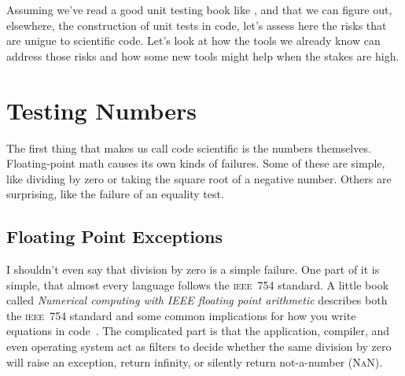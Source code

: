 \documentclass[fleqn,10pt]{olplainarticle}
\newcommand{\nan}{\textsc{NaN}\xspace}
\newcommand{\ieee}{\textsc{ieee}\xspace}
\begin{document}
Assuming we've read a good unit testing book like \cite{jorgensen2013},
and that we can figure out, elsewhere, the construction of unit tests
in code, let's assess here the risks that are unigue to scientific code.
Let's look at how the tools we already know can address those risks
and how some new tools might help when the stakes are high.




\section{Testing Numbers}\label{sec:ieee-numbers}

The first thing that makes us call code scientific is the numbers themselves.
Floating-point math causes its own kinds of failures. Some of these are simple,
like dividing by zero or taking the square root of a negative number.
Others are surprising, like the failure of an equality test.

\subsection{Floating Point Exceptions}
I shouldn't even say that division by zero is a simple failure.
One part of it is simple, that almost every language follows the
\ieee~754 standard.
A little book called \emph{Numerical computing with IEEE floating point arithmetic}
describes both the \ieee~754 standard
and some common implications for how you write equations in code~\citep{overton2001numerical}.
The complicated part is that the application, compiler,
and even operating system act as filters to decide whether the same division
by zero will raise an exception, return infinity, or silently return not-a-number (\nan).
\end{document}
